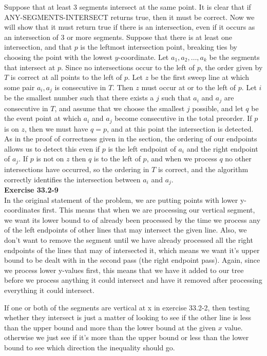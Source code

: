 \documentclass{article}
\begin{document}
Suppose that at least 3 segments intersect at the same point.  It is clear that if ANY-SEGMENTS-INTERSECT returns true, then it must be correct.  Now we will show that it must return true if there is an intersection, even if it occurs as an intersection of 3 or more segments.  Suppose that there is at least one intersection, and that $p$ is the leftmost intersection point, breaking ties by choosing the point with the lowest $y$-coordinate.  Let $a_1, a_2, \ldots, a_k$ be the segments that intersect at $p$.  Since no intersections occur to the left of $p$, the order given by $T$ is correct at all points to the left of $p$.  Let $z$ be the first sweep line at which some pair $a_i, a_j$ is consecutive in $T$. Then $z$ must occur at or to the left of $p$.  Let $i$ be the smallest number such that there exists a $j$ such that $a_i$ and $a_j$ are consecutive in $T$, and assume that we choose the smallest $j$ possible, and let $q$ be the event point at which $a_i$ and $a_j$ become consecutive in the total preorder.  If $p$ is on $z$, then we must have $q=p$, and at this point the intersection is detected. As in the proof of correctness given in the section, the ordering of our endpoints allows us to detect this even if $p$ is the left endpoint of $a_i$ and the right endpoint of $a_j$.  If $p$ is not on $z$ then $q$ is to the left of $p$, and when we process $q$ no other intersections have occurred, so the ordering in $T$ is correct, and the algorithm correctly identifies the intersection between $a_i$ and $a_j$. \\


\noindent\textbf{Exercise 33.2-9}\\

In the original statement of the problem, we are putting points with lower y-coordinates first. This means that when we are processing our vertical segment, we want its  lower bound to of already been processed by the time we process any of the left endpoints of other lines that may intersect the given line.  Also, we don't want to remove the segment until we have already processed all the right endpoints of the lines that may of intersected it, which means we want it's upper bound to be dealt with in the second pass (the right endpoint pass). Again, since we process lower y-values first, this means that we have it added to our tree before we process anything it could intersect and have it removed after processing everything it could intersect.

If one or both of the segments are vertical at x in exercise 33.2-2, then testing whether they intersect is just a matter of looking to see if the other line is less than the upper bound and more than the lower bound at the given $x$ value. otherwise we just see if it's more than the upper bound or less than the lower bound to see which direction the inequality should go.\\
\end{document}
